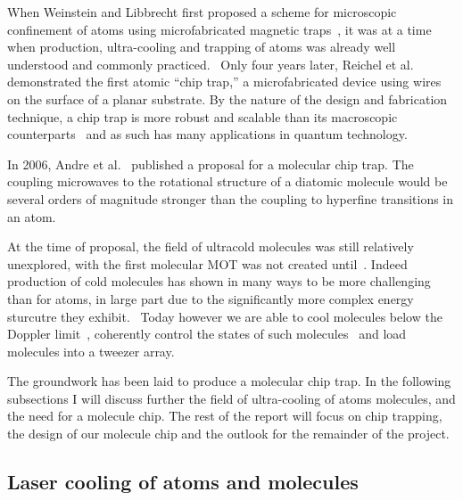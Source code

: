 
When Weinstein and Libbrecht first proposed a scheme for microscopic confinement
of atoms using microfabricated magnetic traps~\cite{PhysRevA.52.4004}, it was at
a time when production, ultra-cooling and trapping of atoms was already well
understood and commonly practiced.~ Only four
years later, Reichel et al.~\cite{Reichel1999} demonstrated the first atomic
``chip trap,'' a microfabricated device using wires on the surface of a planar
substrate. By the nature of the design and fabrication technique, a chip trap is
more robust and scalable than its macroscopic counterparts~ and
as such has many applications in quantum technology.


In 2006, Andre et al.~\cite{Andre2006} published a proposal for a molecular chip
trap. The coupling microwaves to the rotational structure of a diatomic molecule
would be several orders of magnitude stronger than the coupling to hyperfine
transitions in an atom. 

At the time of proposal, the field of ultracold molecules was still relatively
unexplored, with the first molecular MOT was not created until~. Indeed production of cold molecules has shown in many ways to be more
challenging than for atoms, in large part due to the significantly more complex
energy sturcutre they exhibit.~ Today however we are able to cool
molecules below the Doppler limit~\cite{Truppe2017}, coherently control the
states of such molecules~\cite{PhysRevLett.120.163201} and load molecules into a
tweezer array.~\cite{Anderegg2019}

The groundwork has been laid to produce a molecular chip trap. In the following
subsections I will discuss further the field of ultra-cooling of atoms molecules, and
the need for a molecule chip. The rest of the report will focus on chip
trapping, the design of our molecule chip and the outlook for the remainder of
the project.

\subsection{Laser cooling of atoms and molecules}
\label{intro:lasercool}

